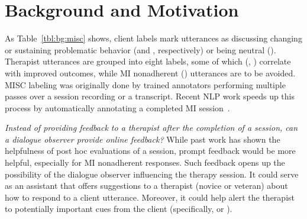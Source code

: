 \section{Background and Motivation}
\label{sec:snt:background}
As Table~\ref{tbl:bg:misc} shows, client labels mark utterances as
discussing changing or sustaining problematic behavior (\CHANGE and
\SUSTAIN, respectively) or being neutral (\FN). Therapist utterances
are grouped into eight labels, some of which (\RES, \REC) correlate
with improved outcomes, while MI nonadherent (\MIN) utterances are to
be avoided.  MISC labeling was originally done by trained annotators
performing multiple passes over a session recording or a transcript.
Recent NLP work speeds up this process by automatically annotating a
completed MI session~\citep[\eg,][]{tanana2016comparison,
  xiao2016behavioral, perez2017predicting}.

\emph{Instead of providing feedback to a therapist after the
  completion of a session, can a dialogue observer provide online
  feedback?} While past work has shown the helpfulness of post hoc
evaluations of a session, prompt feedback would be more helpful,
especially for MI nonadherent responses.  Such feedback opens up
the possibility of the dialogue observer influencing the therapy
session. It could serve as an assistant that offers suggestions to a
therapist (novice or veteran) about how to respond to a client
utterance. Moreover, it could help alert the therapist to
potentially important cues from the client (specifically, \CHANGE or
\SUSTAIN). %




